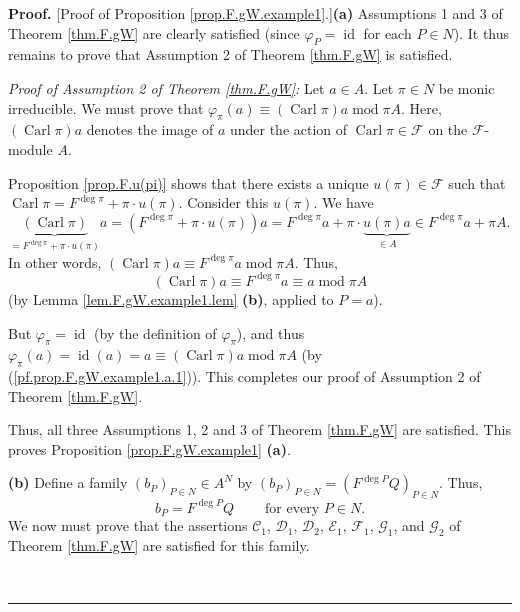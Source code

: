 \documentclass[numbers=enddot,12pt,final,onecolumn,notitlepage]{scrartcl}%
\theoremstyle{definition}
\newenvironment{proof}[1][Proof]{\noindent\textbf{#1.} }{\ \rule{0.5em}{0.5em}}
\begin{document}
\begin{proof}
[Proof of Proposition \ref{prop.F.gW.example1}.]\textbf{(a)} Assumptions 1 and
3 of Theorem \ref{thm.F.gW} are clearly satisfied (since $\varphi
_{P}=\operatorname*{id}$ for each $P\in N$). It thus remains to prove that
Assumption 2 of Theorem \ref{thm.F.gW} is satisfied.

\textit{Proof of Assumption 2 of Theorem \ref{thm.F.gW}:} Let $a\in A$. Let
$\pi\in N$ be monic irreducible. We must prove that $\varphi_{\pi}\left(
a\right)  \equiv\left(  \operatorname*{Carl}\pi\right)  a\operatorname{mod}\pi
A$. Here, $\left(  \operatorname*{Carl}\pi\right)  a$ denotes the image of $a$
under the action of $\operatorname*{Carl}\pi\in\mathcal{F}$ on the
$\mathcal{F}$-module $A$.

Proposition \ref{prop.F.u(pi)} shows that there exists a unique $u\left(
\pi\right)  \in\mathcal{F}$ such that $\operatorname*{Carl}\pi=F^{\deg\pi}%
+\pi\cdot u\left(  \pi\right)  $. Consider this $u\left(  \pi\right)  $. We
have%
\[
\underbrace{\left(  \operatorname*{Carl}\pi\right)  }_{=F^{\deg\pi}+\pi\cdot
u\left(  \pi\right)  }a=\left(  F^{\deg\pi}+\pi\cdot u\left(  \pi\right)
\right)  a=F^{\deg\pi}a+\pi\cdot\underbrace{u\left(  \pi\right)  a}_{\in A}\in
F^{\deg\pi}a+\pi A.
\]
In other words, $\left(  \operatorname*{Carl}\pi\right)  a\equiv F^{\deg\pi
}a\operatorname{mod}\pi A$. Thus,%
\begin{equation}
\left(  \operatorname*{Carl}\pi\right)  a\equiv F^{\deg\pi}a\equiv
a\operatorname{mod}\pi A \label{pf.prop.F.gW.example1.a.1}%
\end{equation}
(by Lemma \ref{lem.F.gW.example1.lem} \textbf{(b)}, applied to $P=a$).

But $\varphi_{\pi}=\operatorname*{id}$ (by the definition of $\varphi_{\pi}$),
and thus $\varphi_{\pi}\left(  a\right)  =\operatorname*{id}\left(  a\right)
=a\equiv\left(  \operatorname*{Carl}\pi\right)  a\operatorname{mod}\pi A$ (by
(\ref{pf.prop.F.gW.example1.a.1})). This completes our proof of Assumption 2
of Theorem \ref{thm.F.gW}.

Thus, all three Assumptions 1, 2 and 3 of Theorem \ref{thm.F.gW} are
satisfied. This proves Proposition \ref{prop.F.gW.example1} \textbf{(a)}.
\medskip

\textbf{(b)} Define a family $\left(  b_{P}\right)  _{P\in N}\in A^{N}$ by
$\left(  b_{P}\right)  _{P\in N}=\left(  F^{\deg P}Q\right)  _{P\in N}$. Thus,%
\begin{equation}
b_{P}=F^{\deg P}Q\ \ \ \ \ \ \ \ \ \ \text{for every }P\in N.
\label{pf.prop.F.gW.example1.b.bP=}%
\end{equation}
We now must prove that the assertions $\mathcal{C}_{1}$, $\mathcal{D}_{1}$,
$\mathcal{D}_{2}$, $\mathcal{E}_{1}$, $\mathcal{F}_{1}$, $\mathcal{G}_{1}$,
and $\mathcal{G}_{2}$ of Theorem \ref{thm.F.gW} are satisfied for this family.


\end{proof}
\end{document}
